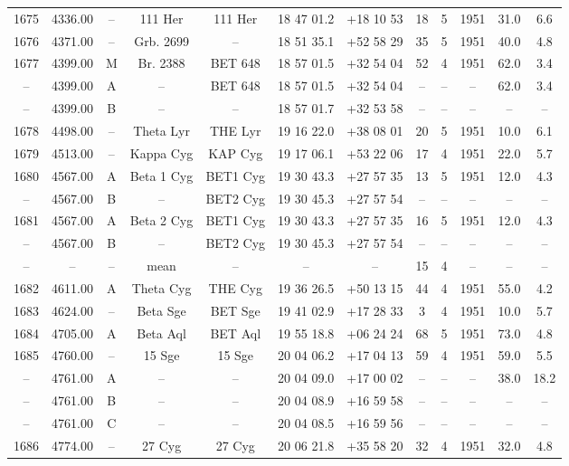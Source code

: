 \begin{table}
\begin{tabular}{cccccccccccc}
1675 & 4336.00 & -- & 111 Her & 111 Her & 18 47 01.2 & +18 10 53 & 18 & 5 & 1951 & 31.0 & 6.6 \\
1676 & 4371.00 & -- & Grb. 2699 & -- & 18 51 35.1 & +52 58 29 & 35 & 5 & 1951 & 40.0 & 4.8 \\
1677 & 4399.00 & M & Br. 2388 & BET 648 & 18 57 01.5 & +32 54 04 & 52 & 4 & 1951 & 62.0 & 3.4 \\
-- & 4399.00 & A & -- & BET 648 & 18 57 01.5 & +32 54 04 & -- & -- & -- & 62.0 & 3.4 \\
-- & 4399.00 & B & -- & -- & 18 57 01.7 & +32 53 58 & -- & -- & -- & -- & -- \\
1678 & 4498.00 & -- & Theta Lyr & THE Lyr & 19 16 22.0 & +38 08 01 & 20 & 5 & 1951 & 10.0 & 6.1 \\
1679 & 4513.00 & -- & Kappa Cyg & KAP Cyg & 19 17 06.1 & +53 22 06 & 17 & 4 & 1951 & 22.0 & 5.7 \\
1680 & 4567.00 & A & Beta 1 Cyg & BET1 Cyg & 19 30 43.3 & +27 57 35 & 13 & 5 & 1951 & 12.0 & 4.3 \\
-- & 4567.00 & B & -- & BET2 Cyg & 19 30 45.3 & +27 57 54 & -- & -- & -- & -- & -- \\
1681 & 4567.00 & A & Beta 2 Cyg & BET1 Cyg & 19 30 43.3 & +27 57 35 & 16 & 5 & 1951 & 12.0 & 4.3 \\
-- & 4567.00 & B & -- & BET2 Cyg & 19 30 45.3 & +27 57 54 & -- & -- & -- & -- & -- \\
-- & -- & -- & mean & -- & -- & -- & 15 & 4 & -- & -- & -- \\
1682 & 4611.00 & A & Theta Cyg & THE Cyg & 19 36 26.5 & +50 13 15 & 44 & 4 & 1951 & 55.0 & 4.2 \\
1683 & 4624.00 & -- & Beta Sge & BET Sge & 19 41 02.9 & +17 28 33 & 3 & 4 & 1951 & 10.0 & 5.7 \\
1684 & 4705.00 & A & Beta Aql & BET Aql & 19 55 18.8 & +06 24 24 & 68 & 5 & 1951 & 73.0 & 4.8 \\
1685 & 4760.00 & -- & 15 Sge & 15 Sge & 20 04 06.2 & +17 04 13 & 59 & 4 & 1951 & 59.0 & 5.5 \\
-- & 4761.00 & A & -- & -- & 20 04 09.0 & +17 00 02 & -- & -- & -- & 38.0 & 18.2 \\
-- & 4761.00 & B & -- & -- & 20 04 08.9 & +16 59 58 & -- & -- & -- & -- & -- \\
-- & 4761.00 & C & -- & -- & 20 04 08.5 & +16 59 56 & -- & -- & -- & -- & -- \\
1686 & 4774.00 & -- & 27 Cyg & 27 Cyg & 20 06 21.8 & +35 58 20 & 32 & 4 & 1951 & 32.0 & 4.8 \\

\end{tabular}
\end{table}
